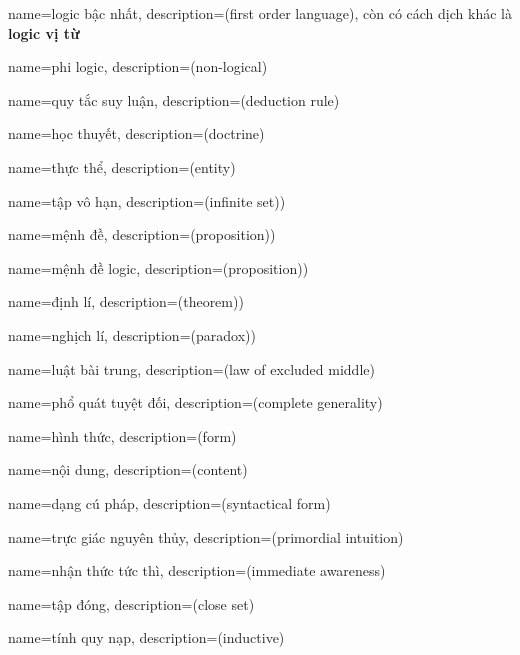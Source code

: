 {
    name={logic bậc nhất},
    description={(first order language), còn có cách dịch khác là \textbf{logic vị từ}}
}

{
    name={phi logic},
    description={(non-logical)}
}

{
    name={quy tắc suy luận},
    description={(deduction rule)}
}

{
    name={học thuyết},
    description={(doctrine)}
}

{
    name={thực thể},
    description={(entity)}
}

{
    name={tập vô hạn},
    description={(infinite set))}
}

{
    name={mệnh đề},
    description={(proposition))}
}

{
    name={mệnh đề logic},
    description={(proposition))}
}

{
    name={định lí},
    description={(theorem))}
}

{
    name={nghịch lí},
    description={(paradox))}
}

{
    name={luật bài trung},
    description={(law of excluded middle)}
}

{
    name={phổ quát tuyệt đối},
    description={(complete generality)}
}

{
    name={hình thức},
    description={(form)}
}

{
    name={nội dung},
    description={(content)}
}

{
    name={dạng cú pháp},
    description={(syntactical form)}
}

{
    name={trực giác nguyên thủy},
    description={(primordial intuition)}
}

{
    name={nhận thức tức thì},
    description={(immediate awareness)}
}

{
    name={tập đóng},
    description={(close set)}
}

{
    name={tính quy nạp},
    description={(inductive)}
}


